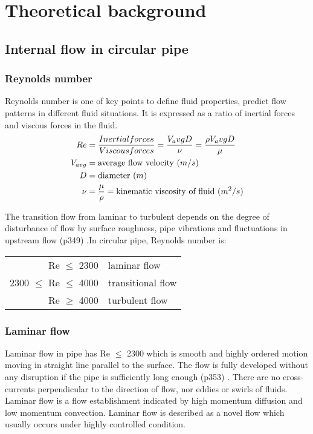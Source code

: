
\chapter{Theoretical background}

\section{Internal flow in circular pipe}

\subsection{Reynolds number}
Reynolds number is one of key points to define fluid properties, predict flow patterns in different fluid situations. It is expressed as a ratio of inertial forces and viscous forces in the fluid. 
\begin{align}
Re & = \frac{Inertial forces}{Viscous forces} = \frac{V_avg D}{\nu} = \frac{\rho V_avg D}{\mu}  \\
V_{avg}  & = \textnormal{average flow velocity ($m/s$)} \\
D & = \textnormal{diameter ($m$)} \\
\nu & = \frac{\mu}{\rho} = \textnormal{kinematic viscosity of fluid ($m^2/s$)} 
\end{align}

The transition flow from laminar to turbulent depends on the degree of disturbance of flow by surface roughness, pipe vibrations and fluctuations in upstream flow (p349) \cite{cengel:book}.In circular pipe, Reynolds number is:
\begin{tabular}{r l}
Re $\leq$ 2300 & laminar flow \\
2300 $\leq$ Re $\leq$ 4000 & transitional flow \\
Re $\geq$ 4000 & turbulent flow
\end{tabular}

\subsection{Laminar flow}

Laminar flow in pipe has Re $\leq$ 2300 which is smooth and highly ordered motion moving in straight line parallel to the surface. The flow is fully developed without any disruption if the pipe is sufficiently long enough (p353) \cite{cengel:book}. There are no cross-currents perpendicular to the direction of flow, nor eddies or swirls of fluids. Laminar flow is a flow establishment indicated  by high momentum diffusion and low momentum convection. Laminar flow is described as a novel flow which usually occurs under highly controlled condition.

